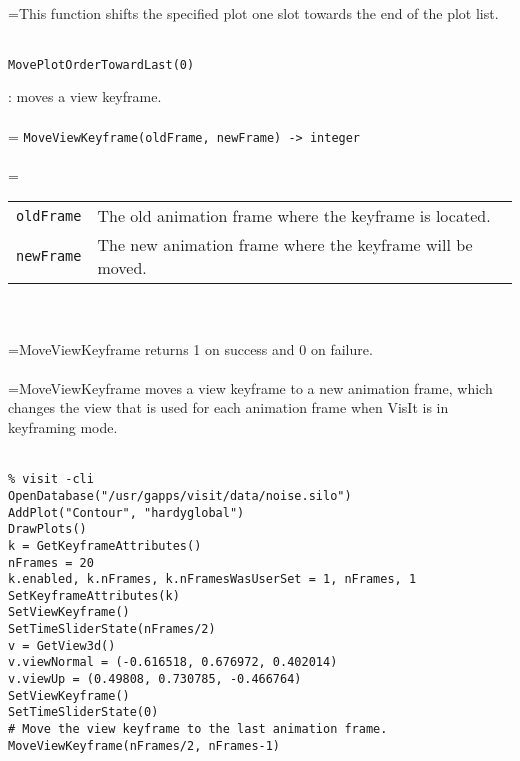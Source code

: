 \documentclass[10pt,a4paper]{report}
\begin{document}
 \\ 
\hangindent=\parindent This function shifts the specified plot one slot towards the end of the plot list. \\[-3mm] 

\\[-6mm]
\begin{verbatim}MovePlotOrderTowardLast(0)
\end{verbatim}
\newpage


{}
: moves a view keyframe.\\[-3mm]

 \\ 
\hangindent=\parindent 
\verb!MoveViewKeyframe(oldFrame, newFrame) -> integer!\\ [-3mm]

 \\ 
\hangindent=\parindent 
\begin{tabular}{lp{9cm}}
\verb!oldFrame! & The old animation frame where the keyframe is located. \\
\verb!newFrame! & The new animation frame where the keyframe will be moved. \\
\end{tabular} \\[-2mm]


 \\ 
\hangindent=\parindent MoveViewKeyframe returns 1 on success and 0 on failure. \\[-3mm] 

 \\ 
\hangindent=\parindent MoveViewKeyframe moves a view keyframe to a new animation frame, which changes the view that is used for each animation frame when VisIt is in keyframing mode. \\[-3mm] 

\\[-6mm]
\begin{verbatim}% visit -cli
OpenDatabase("/usr/gapps/visit/data/noise.silo")
AddPlot("Contour", "hardyglobal")
DrawPlots()
k = GetKeyframeAttributes()
nFrames = 20
k.enabled, k.nFrames, k.nFramesWasUserSet = 1, nFrames, 1
SetKeyframeAttributes(k)
SetViewKeyframe()
SetTimeSliderState(nFrames/2)
v = GetView3d()
v.viewNormal = (-0.616518, 0.676972, 0.402014)
v.viewUp = (0.49808, 0.730785, -0.466764)
SetViewKeyframe()
SetTimeSliderState(0)
# Move the view keyframe to the last animation frame.
MoveViewKeyframe(nFrames/2, nFrames-1)
\end{verbatim}
\newpage
\end{document}
